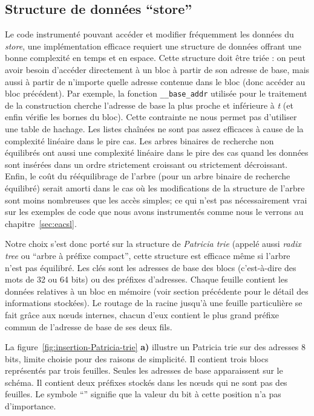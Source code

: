 \subsection{Structure de données ``store''}

Le code instrumenté pouvant accéder et modifier fréquemment les données du
\textit{store}, une implémentation efficace requiert une structure de données
offrant une bonne complexité en temps et en espace.
Cette structure doit être triée : on peut avoir besoin d'accéder directement à
un bloc à partir de son adresse de base, mais aussi à partir de n'importe quelle
adresse contenue dans le bloc (donc accéder au bloc précédent).
Par exemple, la fonction \lstinline'__base_addr' utilisée pour le traitement
de la construction \baseaddrt cherche l'adresse de base la
plus proche et inférieure à \textit{t} (et enfin vérifie les bornes du bloc).
Cette contrainte ne nous permet pas d'utiliser une table de hachage.
Les listes chaînées ne sont pas assez efficaces à cause de la complexité
linéaire dans le pire cas.
Les arbres binaires de recherche non équilibrés ont aussi une complexité
linéaire dans le pire des cas quand les données sont insérées dans un ordre
strictement croissant ou strictement décroissant.
Enfin, le coût du rééquilibrage de l'arbre (pour un arbre binaire de recherche
équilibré) serait amorti dans le cas où les modifications de la structure de
l'arbre sont moins nombreuses que les accès simples; ce qui n'est pas
nécessairement vrai sur les exemples de code que nous avons instrumentés comme
nous le verrons au chapitre~\ref{sec:eacsl}.

Notre choix s'est donc porté sur la structure de {\em Patricia trie}
\cite{Szpankowski/90} (appelé aussi {\em radix tree} ou ``arbre à préfixe
compact'', cette structure est efficace même si l'arbre n'est pas équilibré.
Les clés sont les adresses de base des blocs (c'est-à-dire des mots de 32 ou 64
bits) ou des préfixes d'adresses.
Chaque feuille contient les données relatives à un bloc en mémoire (voir
section précédente pour le détail des informations stockées).
Le routage de la racine jusqu'à une feuille particulière se fait grâce aux
n\oe{}uds internes, chacun d'eux contient le plus grand préfixe commun de
l'adresse de base de ses deux fils.

La figure~\ref{fig:insertion-Patricia-trie} \textbf{a)} illustre un Patricia
trie sur des adresses 8 bits, limite choisie pour des raisons de simplicité.
Il contient trois blocs représentés par trois feuilles.
Seules les adresses de base apparaissent sur le schéma.
Il contient deux préfixes stockés dans les n\oe{}uds qui ne sont pas des
feuilles.
Le symbole ``{\tt *}'' signifie que la valeur du bit à cette position n'a pas
d'importance.

